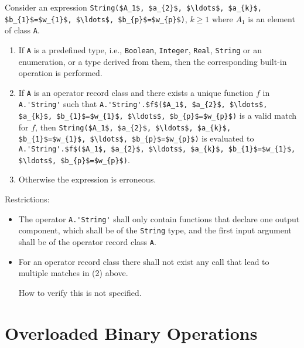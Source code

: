 Consider an expression \lstinline!String($A_1$, $a_{2}$, $\ldots$, $a_{k}$, $b_{1}$=$w_{1}$, $\ldots$, $b_{p}$=$w_{p}$)!,
$k \ge 1$ where $A_1$ is an element of class \lstinline!A!.

\begin{enumerate}
\item
  If \lstinline!A! is a predefined type, i.e., \lstinline!Boolean!, \lstinline!Integer!, \lstinline!Real!, \lstinline!String! or
  an enumeration, or a type derived from them, then the corresponding
  built-in operation is performed.
\item
  If \lstinline!A! is an operator record class and there exists a unique function
  $f$ in \lstinline!A.'String'! such that
  \lstinline!A.'String'.$f$($A_1$, $a_{2}$, $\ldots$, $a_{k}$, $b_{1}$=$w_{1}$, $\ldots$, $b_{p}$=$w_{p}$)!
  is a valid match for $f$, then
  \lstinline!String($A_1$, $a_{2}$, $\ldots$, $a_{k}$, $b_{1}$=$w_{1}$, $\ldots$, $b_{p}$=$w_{p}$)!
  is evaluated to\\
  \lstinline!A.'String'.$f$($A_1$, $a_{2}$, $\ldots$, $a_{k}$, $b_{1}$=$w_{1}$, $\ldots$, $b_{p}$=$w_{p}$)!.
\item
  Otherwise the expression is erroneous.
\end{enumerate}

Restrictions:
\begin{itemize}
\item
  The operator \lstinline!A.'String'! shall only contain functions that declare one
  output component, which shall be of the \lstinline!String! type, and the first
  input argument shall be of the operator record class \lstinline!A!.
\item
  For an operator record class there shall not exist any call that lead
  to multiple matches in (2) above.
  \begin{nonnormative}
  How to verify this is not specified.
  \end{nonnormative}
\end{itemize}

\section{Overloaded Binary Operations}\label{overloaded-binary-operations}

\newcommand{\theop}{X}

